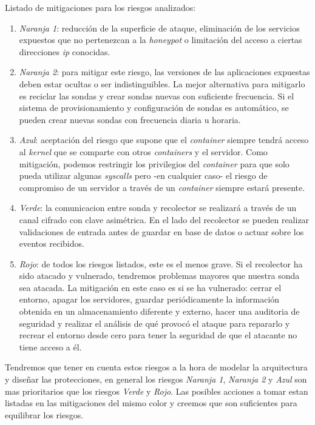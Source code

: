 Listado de mitigaciones para los riesgos analizados:
\begin{enumerate}
    \item \emph{Naranja 1}: reducción de la superficie de ataque, eliminación de los servicios expuestos que no pertenezcan a la \emph{honeypot} o limitación del acceso a ciertas direcciones \emph{ip} conocidas.
    \item \emph{Naranja 2}: para mitigar este riesgo, las versiones de las aplicaciones expuestas deben estar ocultas o ser indistinguibles. La mejor alternativa para mitigarlo es reciclar las sondas y crear sondas nuevas con suficiente frecuencia. Si el sistema de provisionamiento y configuración de sondas es automático, se pueden crear nuevas sondas con frecuencia diaria u horaria.
    \item \emph{Azul}: aceptación del riesgo que supone que el \emph{container} siempre tendrá acceso al \emph{kernel} que se comparte con otros \emph{containers} y el servidor. Como mitigación, podemos restringir los privilegios del \emph{container} para que solo pueda utilizar algunas \emph{syscalls} pero -en cualquier caso- el riesgo de compromiso de un servidor a través de un \emph{container} siempre estará presente. 
    \item \emph{Verde}: la comunicacion entre sonda y recolector se realizará a través de un canal cifrado con clave asimétrica. En el lado del recolector se pueden realizar validaciones de entrada antes de guardar en base de datos o actuar sobre los eventos recibidos.
    \item \emph{Rojo}: de todos los riesgos listados, este es el menos grave. Si el recolector ha sido atacado y vulnerado, tendremos problemas mayores que nuestra sonda sea atacada. La mitigación en este caso es si se ha vulnerado: cerrar el entorno, apagar los servidores, guardar periódicamente la información obtenida en un almacenamiento diferente y externo, hacer una auditoria de seguridad y realizar el análisis de qué provocó el ataque para repararlo y recrear el entorno desde cero para tener la seguridad de que el atacante no tiene acceso a él.
\end{enumerate}

Tendremos que tener en cuenta estos riesgos a la hora de modelar la arquitectura y diseñar las protecciones, en general los riesgos \emph{Naranja 1}, \emph{Naranja 2} y \emph{Azul} son mas prioritarios que los riesgos \emph{Verde} y \emph{Rojo}. Las posibles acciones a tomar estan listadas en las mitigaciones del mismo color y creemos que son suficientes para equilibrar los riesgos.

